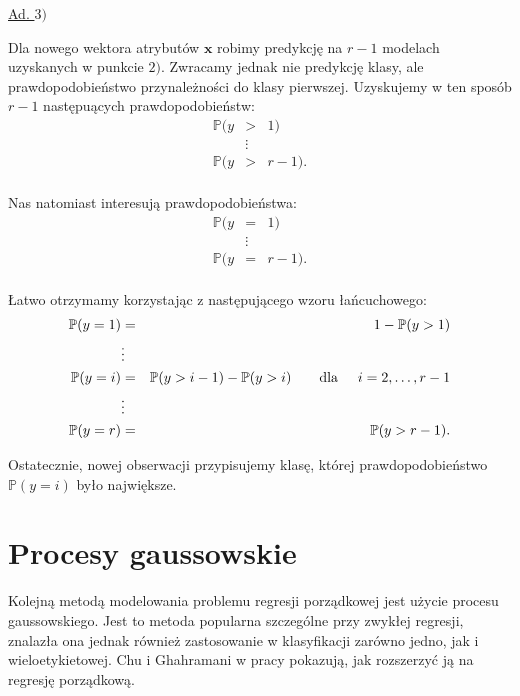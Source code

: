 \documentclass{mini}
\begin{document}
\underline{Ad. $3)$}

Dla nowego wektora atrybutów $\textbf{x}$ robimy predykcję na $r-1$ modelach uzyskanych w punkcie $2)$. Zwracamy jednak nie predykcję klasy, ale prawdopodobieństwo przynależności do klasy pierwszej. Uzyskujemy w ten sposób $r-1$ następuących prawdopodobieństw:
\begin{eqnarray*}
\mathbb{P}(y &>& 1)\\
&\vdots& \\
\mathbb{P}(y &>& r-1).\\
\end{eqnarray*}

Nas natomiast interesują prawdopodobieństwa:
\begin{eqnarray*}
\mathbb{P}(y &=& 1)\\
&\vdots& \\
\mathbb{P}(y &=& r-1).\\
\end{eqnarray*}

Łatwo otrzymamy korzystając z następującego wzoru łańcuchowego:
\begin{eqnarray*}
\mathbb{P}(y = 1) &=& 1 - \mathbb{P}(y > 1)\\
&\vdots& \\
\mathbb{P}(y = i) &=& \mathbb{P}(y > i-1) - \mathbb{P}(y > i) \qquad \text{dla}\hspace{5mm} i=2, \ldots, r-1\\
&\vdots& \\
\mathbb{P}(y = r) &=& \mathbb{P}(y > r-1).\\
\end{eqnarray*}

Ostatecznie, nowej obserwacji przypisujemy klasę, której prawdopodobieństwo $\mathbb{P}(y=i)$ było największe.

\section{Procesy gaussowskie}

Kolejną metodą modelowania problemu regresji porządkowej jest użycie procesu gaussowskiego. Jest to metoda popularna szczególne przy zwykłej regresji, znalazła ona jednak również zastosowanie w klasyfikacji zarówno jedno, jak i wieloetykietowej. Chu i Ghahramani w pracy \cite{reg} pokazują, jak rozszerzyć ją na regresję porządkową. 
\end{document}
